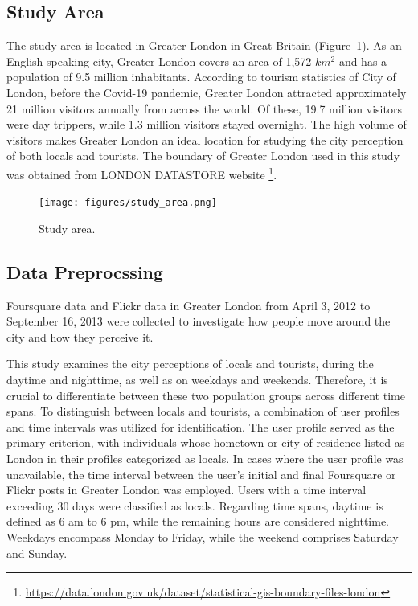 \documentclass{article}
\begin{document}
\subsection{Study Area}
The study area is located in Greater London in Great Britain (Figure~\ref{fig:study_area}). As an English-speaking
city, Greater London covers an area of 1,572 \(km^2\) and has a population of 9.5 million inhabitants. According to tourism statistics of City of London, before the Covid-19 pandemic, Greater London attracted approximately 21 million visitors annually from across the world. Of these, 19.7 million visitors were day trippers, while 1.3 million visitors stayed overnight. The high volume of visitors makes Greater London an ideal location for studying the city perception of both locals and tourists. The boundary of Greater London used in this study was obtained from LONDON DATASTORE website \footnote{\url{https://data.london.gov.uk/dataset/statistical-gis-boundary-files-london}}.

\begin{figure}[h!]
\centering
\texttt{[image: figures/study\_area.png]}
\caption{\label{fig:study_area}Study area.}
\end{figure}

\subsection{Data Preprocssing} \label{data_preprocessing}
Foursquare data and Flickr data in Greater London from April 3, 2012 to September 16, 2013 were collected to investigate how people move around the city and how they perceive it.

This study examines the city perceptions of locals and tourists, during the daytime and nighttime, as well as on weekdays and weekends. Therefore, it is crucial to differentiate between these two population groups across different time spans. To distinguish between locals and tourists, a combination of user profiles and time intervals was utilized for identification. The user profile served as the primary criterion, with individuals whose hometown or city of residence listed as London in their profiles categorized as locals. In cases where the user profile was unavailable, the time interval between the user's initial and final Foursquare or Flickr posts in Greater London was employed. Users with a time interval exceeding 30 days were classified as locals. Regarding time spans, daytime is defined as 6 am to 6 pm, while the remaining hours are considered nighttime. Weekdays encompass Monday to Friday, while the weekend comprises Saturday and Sunday.
\end{document}
